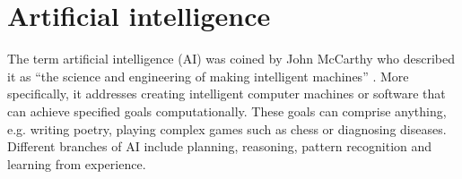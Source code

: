 \section{Artificial intelligence}


The term artificial intelligence (AI) was coined by John McCarthy who described it as ``the science and engineering of making intelligent machines'' \parencite{McCarthy2007:Online}. More specifically, it addresses creating intelligent computer machines or software that can achieve specified goals computationally.  %
These goals can comprise anything, e.g. writing poetry, playing complex games such as chess or diagnosing diseases. Different branches of AI include planning, reasoning, pattern recognition and learning from experience.






